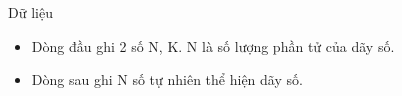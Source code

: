 Dữ liệu
\begin{itemize}
	\item     Dòng đầu ghi 2 số N, K. N là số lượng phần tử của dãy số.   
	\item     Dòng sau ghi N số tự nhiên thể hiện dãy số.   
\end{itemize}